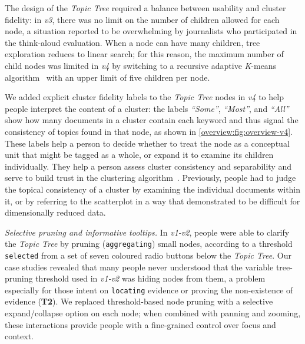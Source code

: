 The design of the {\it Topic Tree} required a balance between usability and cluster fidelity: in {\it v3}, there was no limit on the number of children allowed for each node, a situation reported to be overwhelming by journalists who participated in the think-aloud evaluation.
When a node can have many children, tree exploration reduces to linear search; for this reason, the maximum number of child nodes was limited in {\it v4} by switching to a recursive adaptive {\it K}-means algorithm~\cite{Pham2005} with an upper limit of five children per node.

We added explicit cluster fidelity labels to the {\it Topic Tree} nodes in {\it v4}
to help people interpret the content of a cluster: the labels {\it ``Some''}, {\it ``Most''}, and {\it ``All''} show how many documents in a cluster contain each keyword and thus signal the consistency of topics found in that node, as shown in \autoref{overview:fig:overview-v4}.
These labels help a person to decide whether to treat the node as a conceptual unit that might be tagged as a whole, or expand it to examine its children individually.
They help a person assess cluster consistency and separability and serve to build trust in the clustering algorithm~\cite{Chuang2012}.
Previously, people had to judge the topical consistency of a cluster by examining the individual documents within it, or by referring to the scatterplot in a way that \citet{Sedlmair2013} demonstrated to be difficult for dimensionally reduced data.

\begin{sloppypar}
{\it Selective pruning and informative tooltips.}
In {\it v1-v2}, people were able to clarify the {\it Topic Tree} by pruning ({\tt aggregating}) small nodes, according to a threshold {\tt selected} from a set of seven coloured radio buttons below the {\it Topic Tree}.
Our case studies revealed that many people never understood that the variable tree-pruning threshold used in {\it v1-v2} was hiding nodes from them, a problem especially for those intent on {\tt locating} evidence or proving the non-existence of evidence ({\bf T2}).
We replaced threshold-based node pruning with a selective expand/collapse option on each node; when combined with panning and zooming, these interactions provide people with a fine-grained control over focus and context.
\end{sloppypar}

